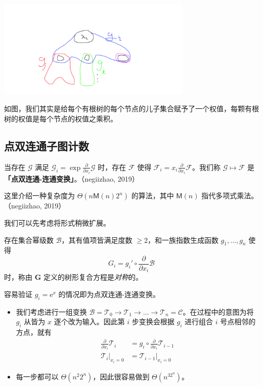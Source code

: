 \documentclass[mathserif]{ctexbeamer}
\newcommand{\me}{\mathrm{e}}
\newcommand{\Mul}{\mathsf{M}}
\begin{document}
\frame
{
  \begin{center}
  \includegraphics[width=0.70\textwidth]{comp.png}
  \end{center}
  
  如图，我们其实是给每个有根树的每个节点的儿子集合赋予了一个权值，每颗有根树的权值是每个节点的权值之乘积。
}

\subsection{点双连通子图计数}
\frame
{
  当存在 $\mathscr G$ 满足 $\mathcal G_i = \exp  \frac{\partial}{\partial x_i} \mathscr G$ 时，存在 $\mathscr F$ 使得 $\mathcal F_i = x_i \frac{\partial}{\partial x_i} \mathscr F$。我们称 $\mathscr G \mapsto \mathscr F$ 是\textbf{「点双连通-连通变换」}。（negiizhao, 2019）
  
  这里介绍一种复杂度为 $\Theta(n\Mul(n)2^n)$ 的算法，其中 $\Mul(n)$ 指代多项式乘法。（negiizhao, 2019）
}

\frame
{
  我们可以先考虑将形式稍微扩展。
  
  \begin{definition}[对称复合方程]
存在集合幂级数 $\mathscr B$，其有值项皆满足度数 $\ge 2$，和一族指数生成函数 $g_1,\dots,g_n$ 使得
$$
G_i=g_i'\circ \frac{\partial}{\partial x_i} \mathscr B
$$
时，称由 $\mathbf G$ 定义的树形复合方程是\emph{对称}的。
\end{definition}

  容易验证 $g_i = \me^x$ 的情况即为点双连通-连通变换。
}

\frame
{
  \begin{itemize}
  \item<1-> 我们考虑进行一组变换 $\mathscr B = \mathscr T_0 \rightarrow \mathscr T_1\rightarrow \dots \rightarrow \mathscr T_n = \mathscr C$。在过程中的意图为将 $g_i$ 从皆为 $x$ 逐个改为输入。因此第 $i$ 步变换会根据 $g_i$ 进行组合 $i$ 号点相邻的方点，就有
\begin{align*}
\frac{\partial}{\partial x_i} \mathscr T_{i} &= g_i \circ \frac{\partial}{\partial x_i}\mathscr T_{i-1}\\
\left.\mathscr T_i\right|_{x_i=0} &= \left.\mathscr T_{i-1}\right|_{x_i=0}
\end{align*}
  \item<2-> 每一步都可以 $\Theta(n^2 2^n)$，因此很容易做到 $\Theta(n^32^n)$。
  \end{itemize}
}
\end{document}
